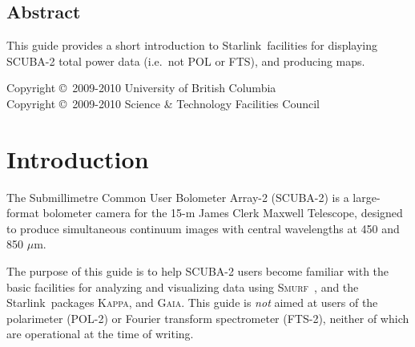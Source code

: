 \documentclass[twoside,11pt]{article}
\newcommand{\micron}{\mbox{\,${\mu}$m}}            %
\newcommand{\stardocinitials}  {SC}
\newcommand{\stardoccopyright}
{Copyright \copyright\ 2009-2010 University of British Columbia \\
 Copyright \copyright\ 2009-2010 Science \& Technology Facilities Council}
\newcommand{\stardocnumber}    {19.3}
\newcommand{\stardocabstract}  {

  This guide provides a short introduction to \starlink\ facilities
  for displaying SCUBA-2 total power data (i.e.~not POL or FTS), and
  producing maps.

}
\newcommand{\starlink}{\htmladdnormallink{Starlink}{http://starlink.jach.hawaii.edu}}
\newcommand{\Kappa}{\xref{\textsc{Kappa}}{sun95}{}}
\newcommand{\gaia}{\xref{\textsc{Gaia}}{sun214}{}}
\newcommand{\smurf}{\xref{\textsc{Smurf}}{sun258}{}}
\newcommand{\stardocname}{\stardocinitials /\stardocnumber}
\newcommand{\htmladdnormallink}[2]{#1}
\newenvironment{latexonly}{}{}
\newcommand{\xref}[3]{#1}
\newcommand{\xlabel}[1]{}
\renewcommand{\_}{\texttt{\symbol{95}}}
\renewcommand{\thepage}{\roman{page}}
\begin{document}
\begin{htmlonly}
  \section{\xlabel{abstract}Abstract}
\end{htmlonly}

\stardocabstract

\begin{latexonly}
\newpage
\vspace*{\fill}
\stardoccopyright
\end{latexonly}

  \newpage
  \begin{latexonly}
    \setlength{\parskip}{0mm}
    \tableofcontents
    \setlength{\parskip}{\medskipamount}
    \markboth{\stardocname}{\stardocname}
  \end{latexonly}

\cleardoublepage
\renewcommand{\thepage}{\arabic{page}}
\setcounter{page}{1}

\section{\xlabel{introduction}Introduction}

The Submillimetre Common User Bolometer Array-2 (SCUBA-2) is a
large-format bolometer camera for the 15-m James Clerk Maxwell
Telescope, designed to produce simultaneous continuum images with
central wavelengths at 450 and 850\,\micron.

The purpose of this guide is to help SCUBA-2 users become familiar
with the basic facilities for analyzing and visualizing data using
\smurf\ \cite{smurf}, and the \starlink\ packages \Kappa \cite{kappa},
and \gaia \cite{gaia}.  This guide is {\em not} aimed at users of the
polarimeter (POL-2) or Fourier transform spectrometer (FTS-2), neither of
which are operational at the time of writing.
\end{document}
